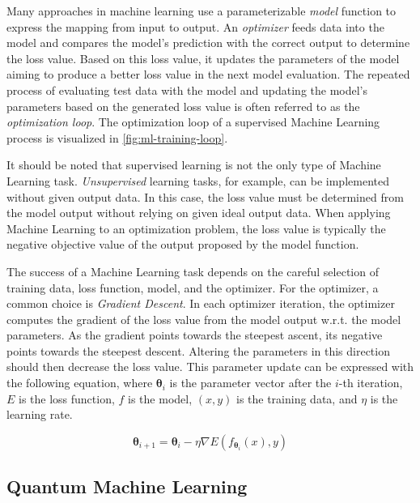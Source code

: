 Many approaches in machine learning use a parameterizable \emph{model} function
to express the mapping from input to output.
An \emph{optimizer} feeds data into the model and compares the model's
prediction with the correct output to determine the loss value.
Based on this loss value, it updates the parameters of the model aiming to
produce a better loss value in the next model evaluation. 
The repeated process of evaluating test data with the model and updating the
model's parameters based on the generated loss value is often referred to as the
\emph{optimization loop}.
The optimization loop of a supervised Machine Learning process is visualized in
\autoref{fig:ml-training-loop}.

It should be noted that supervised learning is not the only type of
Machine Learning task.
\emph{Unsupervised} learning tasks, for example, can be implemented without
given output data.
In this case, the loss value must be determined from the model output without
relying on given ideal output data.
When applying Machine Learning to an optimization problem, the loss value is
typically the negative objective value of the output proposed by the model
function.

The success of a Machine Learning task depends on the careful selection of
training data, loss function, model, and the optimizer.
For the optimizer, a common choice is \emph{Gradient Descent}.
In each optimizer iteration, the optimizer computes the gradient of the loss
value from the model output w.r.t. the model parameters.
As the gradient points towards the steepest ascent, its negative points towards
the steepest descent.
Altering the parameters in this direction should then decrease the loss value.
This parameter update can be expressed with the following equation, where
$\mathbf{\theta}_i$ is the parameter vector after the $i$-th iteration, $E$ is
the loss function, $f$ is the model, $(x,y)$ is the training data, and $\eta$ is
the learning rate.

\begin{equation}
    \mathbf{\theta}_{i+1} = \mathbf{\theta}_i - \eta\nabla E(f_{\mathbf{\theta}_i}(x), y)
\end{equation}


\subsection{Quantum Machine Learning}
\label{sec:real-qml-intro}


